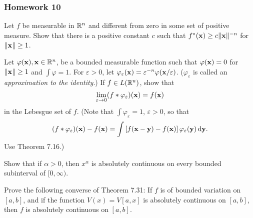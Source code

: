 \subsubsection{Homework 10}
\setcounter{exercise}{0}
\setcounter{equation}{0}

\begin{problem}
  Let $f$ be measurable in $\mathbb{R}^n$ and different from zero in some set of
  positive measure. Show that there is a positive constant $c$ such that
  $f^*(\mathbf{x})\geq c\|\mathbf{x}\|^{-n}$ for $\|\mathbf{x}\|\geq 1$.
\end{problem}
\begin{solution}
\end{solution}

\begin{problem}
  Let $\varphi(\mathbf{x}),\mathbf{x}\in\mathbb{R}^n$, be a bounded measurable function such
  that $\varphi(\mathbf{x})=0$ for $\|\mathbf{x}\|\geq 1$ and $\int\varphi=1$. For
  $\varepsilon>0$, let
  $\varphi_\varepsilon(\mathbf{x})=\varepsilon^{-n}\varphi(\mathbf{x}/\varepsilon)$.
  ($\varphi_\varepsilon$ is called an \emph{approximation to the
    identity}.) If $f\in L(\mathbb{R}^n)$, show that
  \[
    \lim_{\varepsilon\to 0}(f*\varphi_\varepsilon)(\mathbf{x})=f(\mathbf{x})
  \]
  in the Lebesgue set of $f$. (Note that $\int\varphi_\varepsilon=1$,
  $\varepsilon>0$, so that
  \[
    (f*\varphi_\varepsilon)(\mathbf{x})-f(\mathbf{x})=\int\left[f(\mathbf{x}-\mathbf{y})-f(\mathbf{x})\right]\varphi_\varepsilon(\mathbf{y})\mathop{}\!\mathrm{d}\mathbf{y}.
  \]
  Use Theorem 7.16.)
\end{problem}
\begin{solution}
\end{solution}

\begin{problem}
  Show that if $\alpha>0$, then $x^\alpha$ is absolutely continuous on
  every bounded subinterval of $[0,\infty)$.
\end{problem}
\begin{solution}
\end{solution}

\begin{problem}
  Prove the following converse of Theorem 7.31: If $f$ is of bounded
  variation on $[a,b]$, and if the function $V(x)=V[a,x]$ is absolutely
  continuous on $[a,b]$, then $f$ is absolutely continuous on $[a,b]$.
\end{problem}
\begin{solution}
\end{solution}

